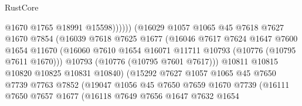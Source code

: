 \begin{lexlean}{RustCore}
\begin{coremodule}
                                        @1670
                                        @1765
                                        @18991
                                        @15598))))))
                            (@16029
                              @1057
                              @1065
                              @45
                              @7618
                              @7627
                              @1670
                              @7854
                              (@16039
                                @7618
                                @7625
                                @1677
                                (@16046
                                  @7617
                                  @7624
                                  @1647
                                  @7600
                                  @1654
                                  @11670
                                  (@16060
                                    @7610
                                    @1654
                                    @16071
                                    @11711
                                    @10793
                                    (@10776 (@10795 @7611 @1670)))
                                  @10793
                                  (@10776 (@10795 @7601 @7617)))
                                @10811
                                @10815
                                @10820
                                @10825
                                @10831
                                @10840)
                              (@15292
                                @7627
                                @1057
                                @1065
                                @45
                                @7650
                                @7739
                                @7763
                                @7852
                                (@19047
                                  @1056
                                  @45
                                  @7650
                                  @7659
                                  @1670
                                  @7739
                                  (@16111
                                    @7650
                                    @7657
                                    @1677
                                    (@16118
                                      @7649
                                      @7656
                                      @1647
                                      @7632
                                      @1654

\end{coremodule}
\end{lexlean}
